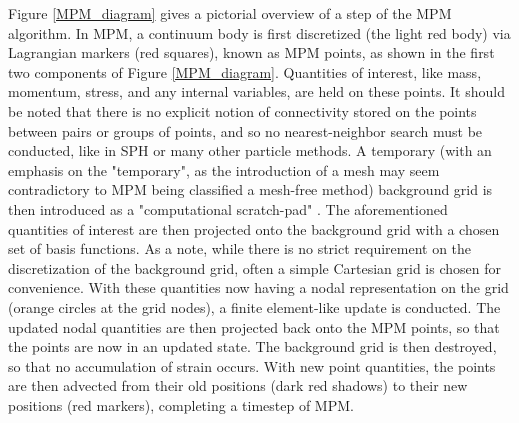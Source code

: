 Figure \ref{MPM_diagram} gives a pictorial overview of a step of the MPM algorithm. In MPM, a continuum body is first discretized (the light red body) via Lagrangian markers (red squares), known as MPM points, as shown in the first two components of Figure \ref{MPM_diagram}. Quantities of interest, like mass, momentum, stress, and any internal variables, are held on these points. It should be noted that there is no explicit notion of connectivity stored on the points between pairs or groups of points, and so no nearest-neighbor search must be conducted, like in SPH or many other particle methods. A temporary (with an emphasis on the "temporary", as the introduction of a mesh may seem contradictory to MPM being classified a mesh-free method) background grid is then introduced as a "computational scratch-pad" . The aforementioned quantities of interest are then projected onto the background grid with a chosen set of basis functions. As a note, while there is no strict requirement on the discretization of the background grid, often a simple Cartesian grid is chosen for convenience. With these quantities now having a nodal representation on the grid (orange circles at the grid nodes), a finite element-like update is conducted. The updated nodal quantities are then projected back onto the MPM points, so that the points are now in an updated state. The background grid is then destroyed, so that no accumulation of strain occurs. With new point quantities, the points are then advected from their old positions (dark red shadows) to their new positions (red markers), completing a timestep of MPM.

